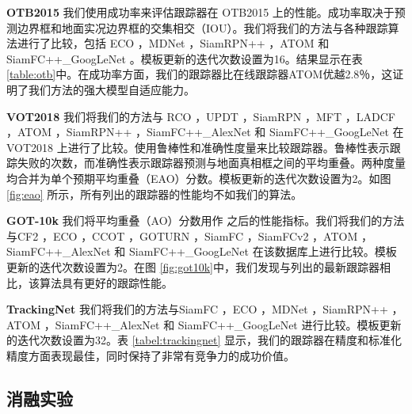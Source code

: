 \textbf{OTB2015} 我们使用成功率来评估跟踪器在 OTB2015 上的性能。成功率取决于预测边界框和地面实况边界框的交集相交（IOU）。我们将我们的方法与各种跟踪算法进行了比较，包括 ECO \cite{danelljan2017eco}，MDNet \cite{nam2016learning}，SiamRPN++ \cite{SiamRPN++}，ATOM \cite{danelljan2019atom} 和 SiamFC++\_GoogLeNet \cite{SiamFC++}。模板更新的迭代次数设置为16。结果显示在表 \ref{table:otb}中。在成功率方面，我们的跟踪器比在线跟踪器ATOM优越2.8％，这证明了我们方法的强大模型自适应能力。

\textbf{VOT2018} 我们将我们的方法与 RCO \cite{kristan2018sixth}，UPDT \cite{bhat2018unveiling}，SiamRPN \cite{SiamRPN}，MFT \cite{kristan2018sixth}，LADCF \cite{kristan2018sixth}，ATOM \cite{danelljan2019atom}，SiamRPN++ \cite{SiamRPN++}，SiamFC++\_AlexNet \cite{SiamFC++} 和 SiamFC++\_GoogLeNet \cite{SiamFC++} 在 VOT2018 上进行了比较。使用鲁棒性和准确性度量来比较跟踪器。鲁棒性表示跟踪失败的次数，而准确性表示跟踪器预测与地面真相框之间的平均重叠。两种度量均合并为单个预期平均重叠（EAO）分数。模板更新的迭代次数设置为2。如图 \ref{fig:eao} 所示，所有列出的跟踪器的性能均不如我们的算法。

\textbf{GOT-10k} 我们将平均重叠（AO）分数用作 \cite{GOT-10k}之后的性能指标。我们将我们的方法与CF2 \cite{CF2}，ECO \cite{danelljan2017eco}，CCOT \cite{CCOT}，GOTURN \cite{GOTURN}，SiamFC \cite{SiamFC}，SiamFCv2 \cite{valmadre2017end}，ATOM \cite{danelljan2019atom}，SiamFC++\_AlexNet \cite{SiamFC++} 和 SiamFC++\_GoogLeNet \cite{SiamFC++} 在该数据库上进行比较。模板更新的迭代次数设置为2。在图 \ref{fig:got10k}中，我们发现与列出的最新跟踪器相比，该算法具有更好的跟踪性能。

\textbf{TrackingNet} 我们将我们的方法与SiamFC \cite{SiamFC}，ECO \cite{danelljan2017eco}，MDNet \cite{nam2016learning}，SiamRPN++ \cite{SiamRPN++}，ATOM \cite{danelljan2019atom}，SiamFC++\_AlexNet \cite{SiamFC++} 和 SiamFC++\_GoogLeNet \cite{SiamFC++} 进行比较。模板更新的迭代次数设置为32。表 \ref{tabel:trackingnet} 显示，我们的跟踪器在精度和标准化精度方面表现最佳，同时保持了非常有竞争力的成功价值。

\subsection{消融实验}

